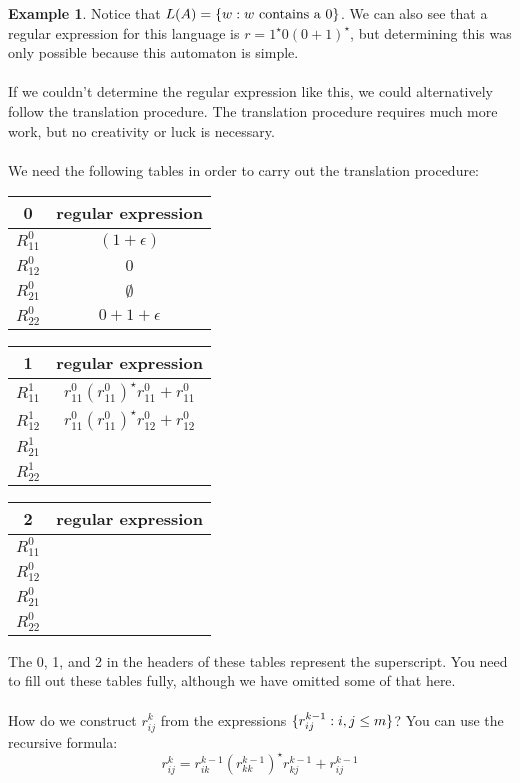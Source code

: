 \documentclass[]{article}
\DeclarePairedDelimiter{\set}{\lbrace}{\rbrace}
\theoremstyle{definition}
\newtheorem{ex}{Example}[section]
\begin{document}
\begin{enumerate}
\begin{ex}
            Notice that $L(A) = \set{ w : w \text{ contains a } 0}$. We can also see that a regular expression for this language is $r = 1^\star 0(0 + 1)^\star$, but determining this was only possible because this automaton is simple.
            \\ \\
            If we couldn't determine the regular expression like this, we could alternatively follow the translation procedure. The translation procedure requires much more work, but no creativity or luck is necessary.
            \\ \\
            We need the following tables in order to carry out the translation procedure:
            \begin{center}
              \begin{tabular}{c|c}
                0 & regular expression \\ \hline
                $R_{11}^0$ & $(1 + \epsilon)$ \\
                $R_{12}^0$ & $0$ \\
                $R_{21}^0$ & $\emptyset$ \\
                $R_{22}^0$ & $0 + 1 + \epsilon$
              \end{tabular}
              \begin{tabular}{c|c}
                1 & regular expression \\ \hline
                $R_{11}^1$ & $r_{11}^0 (r_{11}^0)^\star r_{11}^0 + r_{11}^0$ \\
                $R_{12}^1$ & $r_{11}^0  (r_{11}^0)^\star r_{12}^0 + r_{12}^0$ \\
                $R_{21}^1$ & \\
                $R_{22}^1$ & \\
              \end{tabular}
              \begin{tabular}{c|c}
                2 & regular expression \\ \hline
                $R_{11}^0$ & \\
                $R_{12}^0$ & \\
                $R_{21}^0$ & \\
                $R_{22}^0$ & \\
              \end{tabular}
            \end{center}

            The 0, 1, and 2 in the headers of these tables represent the superscript. You need to fill out these tables fully, although we have omitted some of that here.
            \\ \\
            How do we construct $r_{ij}^k$ from the expressions $\set{ r_{ij}^{k - 1} : i, j \le m }$? You can use the recursive formula:
            $$
              r_{ij}^k = r_{ik}^{k - 1} (r_{kk}^{k - 1})^\star r_{kj}^{k - 1} + r_{ij}^{k - 1}
            $$


\end{ex}
\end{enumerate}
\end{document}
